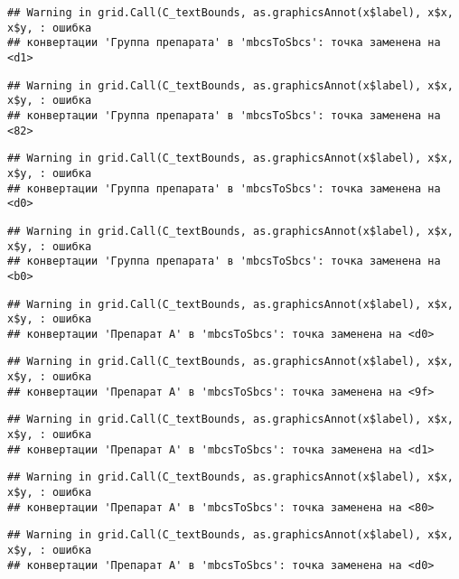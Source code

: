 \documentclass[
]{article}
\begin{document}
\begin{verbatim}
## Warning in grid.Call(C_textBounds, as.graphicsAnnot(x$label), x$x, x$y, : ошибка
## конвертации 'Группа препарата' в 'mbcsToSbcs': точка заменена на <d1>
\end{verbatim}

\begin{verbatim}
## Warning in grid.Call(C_textBounds, as.graphicsAnnot(x$label), x$x, x$y, : ошибка
## конвертации 'Группа препарата' в 'mbcsToSbcs': точка заменена на <82>
\end{verbatim}

\begin{verbatim}
## Warning in grid.Call(C_textBounds, as.graphicsAnnot(x$label), x$x, x$y, : ошибка
## конвертации 'Группа препарата' в 'mbcsToSbcs': точка заменена на <d0>
\end{verbatim}

\begin{verbatim}
## Warning in grid.Call(C_textBounds, as.graphicsAnnot(x$label), x$x, x$y, : ошибка
## конвертации 'Группа препарата' в 'mbcsToSbcs': точка заменена на <b0>
\end{verbatim}

\begin{verbatim}
## Warning in grid.Call(C_textBounds, as.graphicsAnnot(x$label), x$x, x$y, : ошибка
## конвертации 'Препарат A' в 'mbcsToSbcs': точка заменена на <d0>
\end{verbatim}

\begin{verbatim}
## Warning in grid.Call(C_textBounds, as.graphicsAnnot(x$label), x$x, x$y, : ошибка
## конвертации 'Препарат A' в 'mbcsToSbcs': точка заменена на <9f>
\end{verbatim}

\begin{verbatim}
## Warning in grid.Call(C_textBounds, as.graphicsAnnot(x$label), x$x, x$y, : ошибка
## конвертации 'Препарат A' в 'mbcsToSbcs': точка заменена на <d1>
\end{verbatim}

\begin{verbatim}
## Warning in grid.Call(C_textBounds, as.graphicsAnnot(x$label), x$x, x$y, : ошибка
## конвертации 'Препарат A' в 'mbcsToSbcs': точка заменена на <80>
\end{verbatim}

\begin{verbatim}
## Warning in grid.Call(C_textBounds, as.graphicsAnnot(x$label), x$x, x$y, : ошибка
## конвертации 'Препарат A' в 'mbcsToSbcs': точка заменена на <d0>
\end{verbatim}
\end{document}
